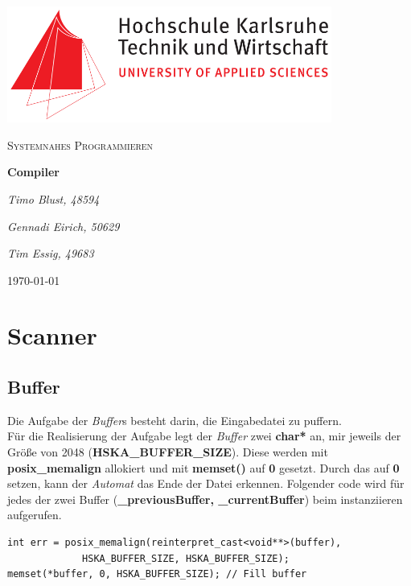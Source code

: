 \documentclass[
    a4paper
]{scrreprt}
\begin{document}
    \sffamily %


    \begin{titlepage}
        \centering
        \includegraphics[width=0.8\textwidth]{./images/logo_hska.png}\par\vspace{1cm}
        \vspace{1cm}

        {\scshape\Large Systemnahes Programmieren\par}
        \vspace{1.5cm}

        {\huge\textbf{Compiler}\par}
        \vspace{2cm}

        {\Large\itshape Timo Blust, 48594\par}
        {\Large\itshape Gennadi Eirich, 50629\par}
        {\Large\itshape Tim Essig, 49683\par}

        \vfill

        {\large \today\par}
    \end{titlepage}


    \tableofcontents

    \chapter{Scanner}
    \section{Buffer}
    Die Aufgabe der \textit{Buffer}s besteht darin, die Eingabedatei zu puffern.\\
    
    Für die Realisierung der Aufgabe legt der \textit{Buffer} zwei \textbf{char*} an, mir jeweils der Größe von 2048 (\textbf{HSKA\_BUFFER\_SIZE}). 
    Diese werden mit \textbf{posix\_memalign} allokiert und mit \textbf{memset()} auf \textbf{0} gesetzt. Durch das auf \textbf{0} setzen, kann der \textit{Automat} das Ende der Datei erkennen. Folgender code wird für jedes der zwei Buffer (\textbf{\_previousBuffer, \_currentBuffer}) beim instanziieren aufgerufen.
	    \begin{lstlisting}
int err = posix_memalign(reinterpret_cast<void**>(buffer), 
			 HSKA_BUFFER_SIZE, HSKA_BUFFER_SIZE);
memset(*buffer, 0, HSKA_BUFFER_SIZE); // Fill buffer
		\end{lstlisting}
	
\end{document}
